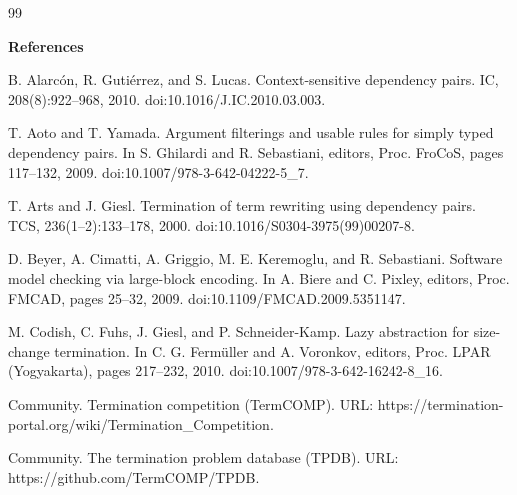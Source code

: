 \documentclass[10pt,a4paper]{amsart}
\begin{document}
 
 
\par
 
 
 

\begin{thebibliography}{99}

 
\par\medskip\noindent\textbf{References}\par
  
\par\noindent  [1]  B. Alarcón, R. Gutiérrez, and S. Lucas.  Context-sensitive dependency pairs.  IC, 208(8):922–968, 2010.  doi:10.1016/J.IC.2010.03.003.  
 
\par\noindent  [2]  T. Aoto and T. Yamada.  Argument filterings and usable rules for simply typed dependency pairs.  In S. Ghilardi and R. Sebastiani, editors, Proc. FroCoS, pages 117–132, 2009.  doi:10.1007/978-3-642-04222-5\_7.  
 
\par\noindent  [3]  T. Arts and J. Giesl.  Termination of term rewriting using dependency pairs.  TCS, 236(1–2):133–178, 2000.  doi:10.1016/S0304-3975(99)00207-8.  
 
\par\noindent  [4]  D. Beyer, A. Cimatti, A. Griggio, M. E. Keremoglu, and R. Sebastiani.  Software model checking via large-block encoding.  In A. Biere and C. Pixley, editors, Proc. FMCAD, pages 25–32, 2009.  doi:10.1109/FMCAD.2009.5351147.  
 
\par\noindent  [5]  M. Codish, C. Fuhs, J. Giesl, and P. Schneider-Kamp.  Lazy abstraction for size-change termination.  In C. G. Fermüller and A. Voronkov, editors, Proc. LPAR (Yogyakarta), pages 217–232, 2010.  doi:10.1007/978-3-642-16242-8\_16.  
 
\par\noindent  [6]  Community.  Termination competition (TermCOMP).  URL: https://termination-portal.org/wiki/Termination\_Competition.  
 
\par\noindent  [7]  Community.  The termination problem database (TPDB).  URL: https://github.com/TermCOMP/TPDB.  
 

\end{thebibliography}
\end{document}
